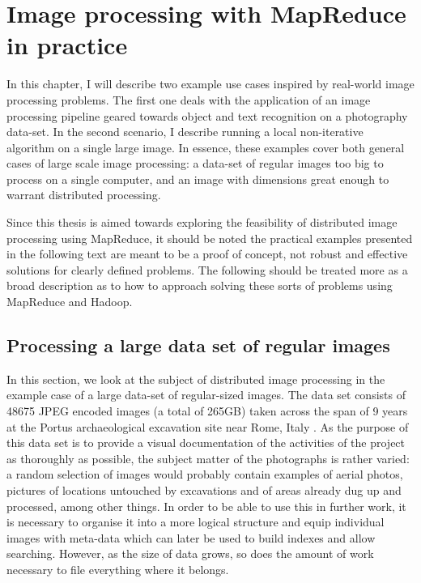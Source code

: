\documentclass [12pt,a4paper]{report}
\begin{document}


\chapter{Image processing with MapReduce in practice}

In this chapter, I will describe two example use cases inspired by real-world image processing problems. The first one deals with the application of an image processing pipeline geared towards object and text recognition on a photography data-set. In the second scenario, I describe running a local non-iterative algorithm on a single large image. In essence, these examples cover both general cases of large scale image processing: a data-set of regular images too big to process on a single computer, and an image with dimensions great enough to warrant distributed processing.

Since this thesis is aimed towards exploring the feasibility of distributed image processing using MapReduce, it should be noted the practical examples presented in the following text are meant to be a proof of concept, not robust and effective solutions for clearly defined problems. The following should be treated more as a broad description as to how to approach solving these sorts of problems using MapReduce and Hadoop.

\section{Processing a large data set of regular images}

In this section, we look at the subject of distributed image processing in the example case of a large data-set of regular-sized images. The data set consists of 48675 JPEG encoded images (a total of 265GB) taken across the span of 9 years at the Portus archaeological excavation site near Rome, Italy \cite{portusproject}. As the purpose of this data set is to provide a visual documentation of the activities of the project as thoroughly as possible, the subject matter of the photographs is rather varied: a random selection of images would probably contain examples of aerial photos, pictures of locations untouched by excavations and of areas already dug up and processed, among other things. In order to be able to use this in further work, it is necessary to organise it into a more logical structure and equip individual images with meta-data which can later be used to build indexes and allow searching. However, as the size of data grows, so does the amount of work necessary to file everything where it belongs.
\end{document}
